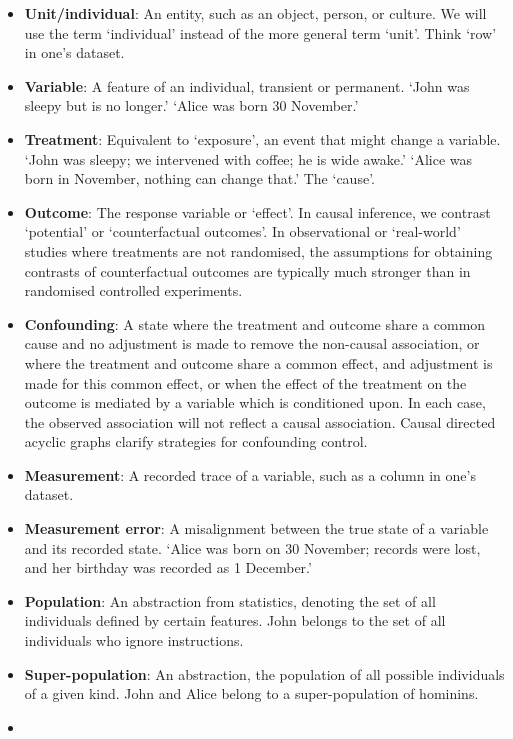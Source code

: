\documentclass[
  single column]{article}
\begin{document}
\begin{itemize}
\item
  \textbf{Unit/individual}: An entity, such as an object, person, or
  culture. We will use the term `individual' instead of the more general
  term `unit'. Think `row' in one's dataset.
\item
  \textbf{Variable}: A feature of an individual, transient or permanent.
  `John was sleepy but is no longer.' `Alice was born 30 November.'
\item
  \textbf{Treatment}: Equivalent to `exposure', an event that might
  change a variable. `John was sleepy; we intervened with coffee; he is
  wide awake.' `Alice was born in November, nothing can change that.'
  The `cause'.
\item
  \textbf{Outcome}: The response variable or `effect'. In causal
  inference, we contrast `potential' or `counterfactual outcomes'. In
  observational or `real-world' studies where treatments are not
  randomised, the assumptions for obtaining contrasts of counterfactual
  outcomes are typically much stronger than in randomised controlled
  experiments.
\item
  \textbf{Confounding}: A state where the treatment and outcome share a
  common cause and no adjustment is made to remove the non-causal
  association, or where the treatment and outcome share a common effect,
  and adjustment is made for this common effect, or when the effect of
  the treatment on the outcome is mediated by a variable which is
  conditioned upon. In each case, the observed association will not
  reflect a causal association. Causal directed acyclic graphs clarify
  strategies for confounding control.
\item
  \textbf{Measurement}: A recorded trace of a variable, such as a column
  in one's dataset.
\item
  \textbf{Measurement error}: A misalignment between the true state of a
  variable and its recorded state. `Alice was born on 30 November;
  records were lost, and her birthday was recorded as 1 December.'
\item
  \textbf{Population}: An abstraction from statistics, denoting the set
  of all individuals defined by certain features. John belongs to the
  set of all individuals who ignore instructions.
\item
  \textbf{Super-population}: An abstraction, the population of all
  possible individuals of a given kind. John and Alice belong to a
  super-population of hominins.
\item

\end{itemize}
\end{document}
